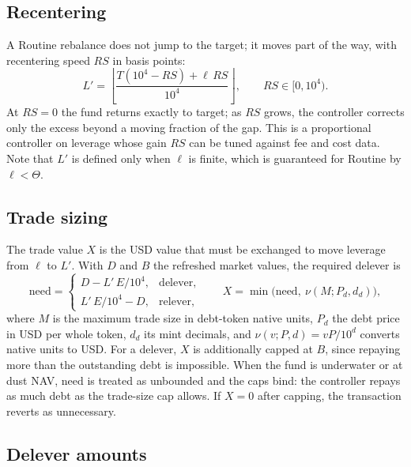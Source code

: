 \documentclass[11pt]{article}
\theoremstyle{remark}
\newcommand{\fl}[1]{\left\lfloor #1 \right\rfloor}
\newcommand{\BPS}{10^{4}}
\newcommand{\NAV}{E}
\newcommand{\Lev}{\ell}
\begin{document}
\subsection{Recentering}

A Routine rebalance does not jump to the target; it moves part of the way, with recentering speed $RS$ in basis points:
\begin{equation}
L' = \fl{\frac{T(\BPS - RS) + \Lev\,RS}{\BPS}},
\qquad RS \in [0,\BPS).
\label{eq:recenter}
\end{equation}
At $RS = 0$ the fund returns exactly to target; as $RS$ grows, the controller corrects only the excess beyond a moving fraction of the gap. This is a proportional controller on leverage whose gain $RS$ can be tuned against fee and cost data. Note that $L'$ is defined only when $\Lev$ is finite, which is guaranteed for Routine by $\Lev < \Theta$.

\subsection{Trade sizing}

The trade value $X$ is the USD value that must be exchanged to move leverage from $\Lev$ to $L'$. With $D$ and $B$ the refreshed market values, the required delever is
\begin{equation}
\mathrm{need} =
\begin{cases}
D - L'\,\NAV/\BPS, & \text{delever},\\[2pt]
L'\,\NAV/\BPS - D, & \text{relever},
\end{cases}
\qquad
X = \min\bigl(\mathrm{need},\ \nu(M; P_d, d_d)\bigr),
\label{eq:trade}
\end{equation}
where $M$ is the maximum trade size in debt-token native units, $P_d$ the debt price in USD per whole token, $d_d$ its mint decimals, and $\nu(v;P,d) = vP/10^{d}$ converts native units to USD. For a delever, $X$ is additionally capped at $B$, since repaying more than the outstanding debt is impossible. When the fund is underwater or at dust NAV, $\mathrm{need}$ is treated as unbounded and the caps bind: the controller repays as much debt as the trade-size cap allows. If $X = 0$ after capping, the transaction reverts as unnecessary.

\subsection{Delever amounts}
\end{document}
